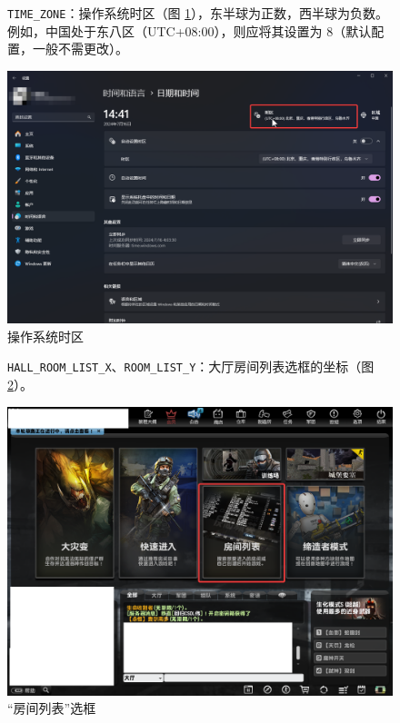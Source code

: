 \begin{figure}[H]
    \Centering
    \parbox[l]{\textwidth}{\lstinline{TIME_ZONE}：操作系统时区（图 \ref{ch2fig-os-timezone}），东半球为正数，西半球为负数。例如，中国处于东八区（UTC+08:00），则应将其设置为 8（默认配置，一般不需更改）。}
    \includegraphics[width=\textwidth]{docs/assets/timezone}
    \caption{操作系统时区}
    \label{ch2fig-os-timezone}
\end{figure}
\clearpage

\begin{figure}[H]
    \Centering
    \parbox[l]{\textwidth}{\lstinline{HALL_ROOM_LIST_X}、\lstinline{ROOM_LIST_Y}：大厅房间列表选框的坐标（图 \ref{ch2fig-room-list}）。}
    \includegraphics[width=\textwidth]{docs/assets/room_list}
    \caption{“房间列表”选框}
    \label{ch2fig-room-list}
\end{figure}
\clearpage

